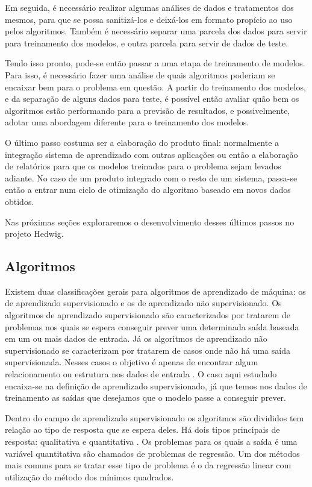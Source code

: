 			Em seguida, é necessário realizar algumas análises de dados e tratamentos dos mesmos, para que se possa sanitizá-los e deixá-los em formato propício ao uso pelos algoritmos. Também é necessário separar uma parcela dos dados para servir para treinamento dos modelos, e outra parcela para servir de dados de teste.

			Tendo isso pronto, pode-se então passar a uma etapa de treinamento de modelos. Para isso, é necessário fazer uma análise de quais algoritmos poderiam se encaixar bem para o problema em questão. A partir do treinamento dos modelos, e da separação de alguns dados para teste, é possível então avaliar quão bem os algoritmos estão performando para a previsão de resultados, e possivelmente, adotar uma abordagem diferente para o treinamento dos modelos.

			O último passo costuma ser a elaboração do produto final: normalmente a integração sistema de aprendizado com outras aplicações ou então a elaboração de relatórios para que os modelos treinados para o problema sejam levados adiante. No caso de um produto integrado com o resto de um sistema, passa-se então a entrar num ciclo de otimização do algoritmo baseado em novos dados obtidos.

			Nas próximas seções exploraremos o desenvolvimento desses últimos passos no projeto Hedwig.

		\subsection{Algoritmos}

			Existem duas classificações gerais para algoritmos de aprendizado de máquina: os de aprendizado supervisionado e os de aprendizado não supervisionado. Os algoritmos de aprendizado supervisionado são caracterizados por tratarem de problemas nos quais se espera conseguir prever uma determinada saída baseada em um ou mais dados de entrada. Já os algoritmos de aprendizado não supervisionado se caracterizam por tratarem de casos onde não há uma saída supervisionada. Nesses casos o objetivo é apenas de encontrar algum relacionamento ou estrutura nos dados de entrada \cite{islr}. O caso aqui estudado encaixa-se na definição de aprendizado supervisionado, já que temos nos dados de treinamento as saídas que desejamos que o modelo passe a conseguir prever.

			Dentro do campo de aprendizado supervisionado os algoritmos são divididos tem relação ao tipo de resposta que se espera deles. Há dois tipos principais de resposta: qualitativa e quantitativa  \cite{islr}. Os problemas para os quais a saída é uma variável quantitativa são chamados de problemas de regressão. Um dos métodos mais comuns para se tratar esse tipo de problema é o da regressão linear com utilização do método dos mínimos quadrados.

